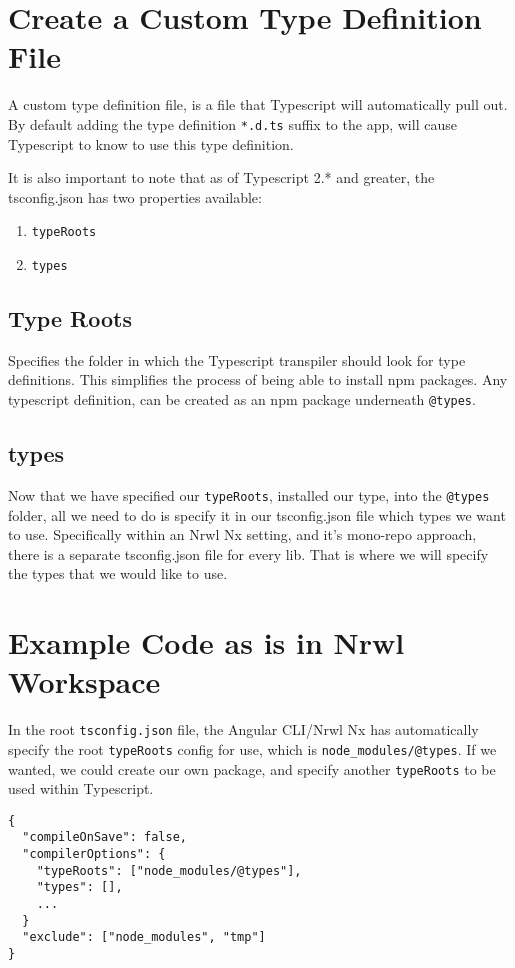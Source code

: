 \section{Create a Custom Type Definition File}
A custom type definition file, is a file that Typescript will automatically 
pull out. By default adding the type definition \lstinline{*.d.ts} suffix to
the app, will cause Typescript to know to use this type definition.

It is also important to note that as of Typescript 2.* and greater, the
tsconfig.json has two properties available: 
\begin{enumerate}
  \item \lstinline{typeRoots}
  \item \lstinline{types}
\end{enumerate}

\subsection{Type Roots}
Specifies the folder in which the Typescript transpiler should look for type 
definitions. This simplifies the process of being able to install npm packages.
Any typescript definition, can be created as an npm package underneath \lstinline{@types}.

\subsection{types}
Now that we have specified our \lstinline{typeRoots}, installed our type, into 
the \lstinline{@types} folder, all we need to do is specify it in our 
tsconfig.json file which types we want to use. Specifically within an Nrwl Nx 
setting, and it's mono-repo approach, there is a separate tsconfig.json file 
for every lib. That is where we will specify the types that we would like to 
use. 

\section{Example Code as is in Nrwl Workspace}
In the root \lstinline{tsconfig.json} file, the Angular CLI/Nrwl Nx has automatically
specify the root \lstinline{typeRoots} config for use, which is \lstinline{node_modules/@types}.
If we wanted, we could create our own package, and specify another 
\lstinline{typeRoots} to be used within Typescript. 
\begin{lstlisting}[caption=tsconfig.json]
{
  "compileOnSave": false,
  "compilerOptions": {
    "typeRoots": ["node_modules/@types"],
    "types": [],
    ...
  }
  "exclude": ["node_modules", "tmp"]
}
\end{lstlisting}

